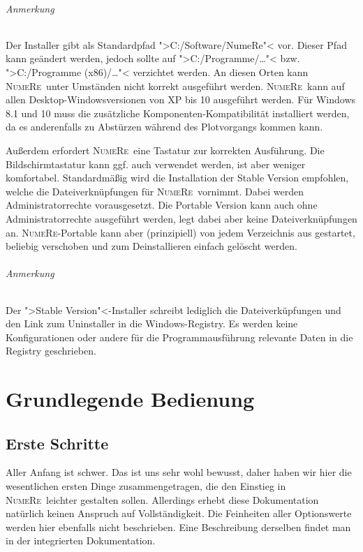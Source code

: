 \documentclass[DIV=14,headsepline,footsepline]{scrbook}
\newcommand{\NR}{\textsc{Nu\-me\-Re}}
\begin{document}
		\paragraph{Anmerkung}
			Der Installer gibt als Standardpfad ">C:/Software/NumeRe"< vor. Dieser Pfad kann geändert werden, jedoch sollte auf ">C:/Programme/\ldots"< bzw. ">C:/Programme (x86)/\ldots"< verzichtet werden. An diesen Orten kann \NR\ unter Umständen nicht korrekt ausgeführt werden.
			\NR\ kann auf allen Desktop-Windowsversionen von XP bis 10 ausgeführt werden. Für Windows 8.1 und 10 muss die zusätzliche Komponenten-Kompatibilität installiert werden, da es anderenfalls zu Abstürzen während des Plotvorgangs kommen kann.
			
			Außerdem erfordert \NR\ eine Tastatur zur korrekten Ausführung. Die Bildschirmtastatur kann ggf. auch verwendet werden, ist aber weniger komfortabel.
			Standardmäßig wird die Installation der Stable Version empfohlen, welche die Dateiverknüpfungen für \NR\ vornimmt. Dabei werden Administratorrechte vorausgesetzt. Die Portable Version kann auch ohne Administratorrechte ausgeführt werden, legt dabei aber keine Dateiverknüpfungen an. \NR-Portable kann aber (prinzipiell) von jedem Verzeichnis aus gestartet, beliebig verschoben und zum Deinstallieren einfach gelöscht werden.
			\paragraph{Anmerkung}
				Der ">Stable Version"<-Installer schreibt lediglich die Dateiverküpfungen und den Link zum Uninstaller in die Windows-Registry. Es werden keine Konfigurationen oder andere für die Programmausführung relevante Daten in die Registry geschrieben.
	\part{Grundlegende Bedienung}
		\chapter{Erste Schritte}
			Aller Anfang ist schwer. Das ist uns sehr wohl bewusst, daher haben wir hier die wesentlichen ersten Dinge zusammengetragen, die den Einstieg in \NR\ leichter gestalten sollen. Allerdings erhebt diese Dokumentation natürlich keinen Anspruch auf Vollständigkeit. Die Feinheiten aller Optionswerte werden hier ebenfalls nicht beschrieben. Eine Beschreibung derselben findet man in der integrierten Dokumentation.
\end{document}
